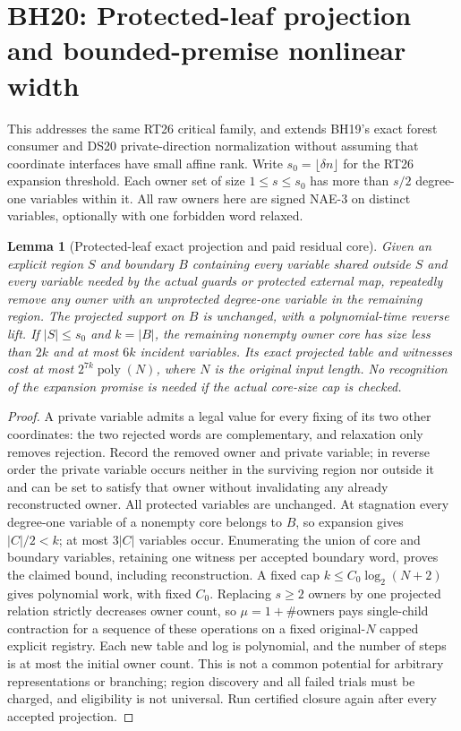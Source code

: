 \documentclass[11pt]{article}
\newtheorem{lemma}[theorem]{Lemma}
\begin{document}
\section{BH20: Protected-leaf projection and bounded-premise nonlinear width}\label{sec:bh20}
This addresses the same RT26 critical family, and extends BH19's exact forest consumer and DS20 private-direction normalization without assuming that coordinate interfaces have small affine rank. Write $s_0=\lfloor\delta n\rfloor$ for the RT26 expansion threshold. Each owner set of size $1\le s\le s_0$ has more than $s/2$ degree-one variables within it. All raw owners here are signed NAE-3 on distinct variables, optionally with one forbidden word relaxed.
\begin{lemma}[Protected-leaf exact projection and paid residual core]\label{lem:bh20-peel}
Given an explicit region $S$ and boundary $B$ containing every variable shared outside $S$ and every variable needed by the actual guards or protected external map, repeatedly remove any owner with an unprotected degree-one variable in the remaining region. The projected support on $B$ is unchanged, with a polynomial-time reverse lift. If $|S|\le s_0$ and $k=|B|$, the remaining nonempty owner core has size less than $2k$ and at most $6k$ incident variables. Its exact projected table and witnesses cost at most $2^{7k}\operatorname{poly}(N)$, where $N$ is the original input length. No recognition of the expansion promise is needed if the actual core-size cap is checked.
\end{lemma}
\begin{proof}
A private variable admits a legal value for every fixing of its two other coordinates: the two rejected words are complementary, and relaxation only removes rejection. Record the removed owner and private variable; in reverse order the private variable occurs neither in the surviving region nor outside it and can be set to satisfy that owner without invalidating any already reconstructed owner. All protected variables are unchanged. At stagnation every degree-one variable of a nonempty core belongs to $B$, so expansion gives $|C|/2<k$; at most $3|C|$ variables occur. Enumerating the union of core and boundary variables, retaining one witness per accepted boundary word, proves the claimed bound, including reconstruction. A fixed cap $k\le C_0\log_2(N+2)$ gives polynomial work, with fixed $C_0$. Replacing $s\ge2$ owners by one projected relation strictly decreases owner count, so $\mu=1+\#\text{owners}$ pays single-child contraction for a sequence of these operations on a fixed original-$N$ capped explicit registry. Each new table and log is polynomial, and the number of steps is at most the initial owner count. This is not a common potential for arbitrary representations or branching; region discovery and all failed trials must be charged, and eligibility is not universal. Run certified closure again after every accepted projection.
\end{proof}
\end{document}
